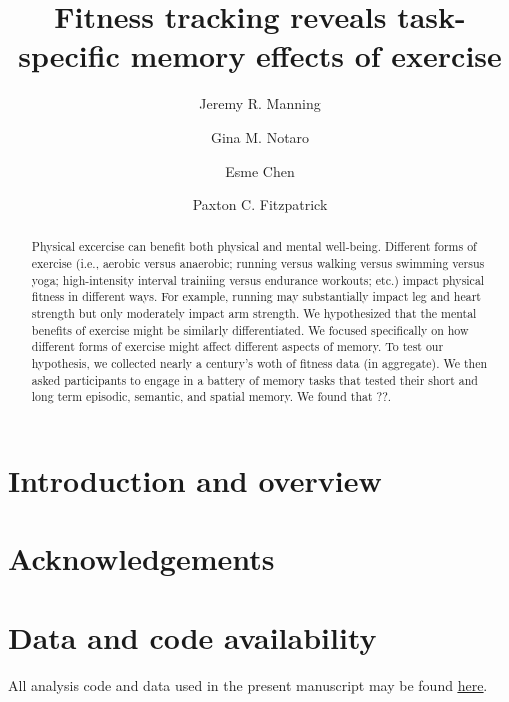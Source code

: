 \documentclass{article}
\title{Fitness tracking reveals task-specific memory effects of exercise}
\author[1]{Jeremy R. Manning}
\author[1,2]{Gina M. Notaro}
\author[1]{Esme Chen}
\author[1]{Paxton C. Fitzpatrick}
\affil[1]{Dartmouth College, Hanover, NH}
\affil[2]{Lockheed Martin, Bethesda, MD}
\begin{document}
\maketitle

\begin{abstract}
Physical excercise can benefit both physical and mental well-being.  Different forms of exercise (i.e., aerobic versus anaerobic; running versus walking versus swimming versus yoga; high-intensity interval trainiing versus endurance workouts; etc.) impact physical fitness in different ways.  For example, running may substantially impact leg and heart strength but only moderately impact arm strength. We hypothesized that the mental benefits of exercise might be similarly differentiated.  We focused specifically on how different forms of exercise might affect different aspects of memory.  To test our hypothesis, we collected nearly a century's woth of fitness data (in aggregate).  We then asked participants to engage in a battery of memory tasks that tested their short and long term episodic, semantic, and spatial memory.  We found that ??.
\end{abstract}

\section*{Introduction and overview}

\section*{Acknowledgements}


\section*{Data and code availability}
All analysis code and data used in the present manuscript may be found \href{https://github.com/ContextLab/brainfit-paper}{\underline{here}}.



\end{document}

